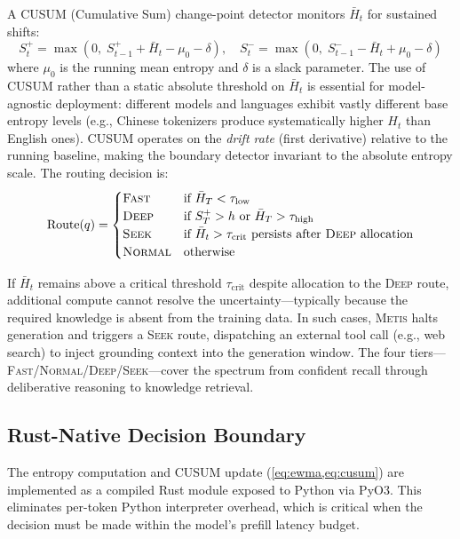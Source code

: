 \documentclass[11pt,a4paper]{article}
\newcommand{\metis}{\textsc{Metis}}
\begin{document}
A CUSUM (Cumulative Sum) change-point detector monitors $\bar{H}_t$ for sustained shifts:
\begin{equation}
    S_t^+ = \max(0,\; S_{t-1}^+ + \bar{H}_t - \mu_0 - \delta), \quad
    S_t^- = \max(0,\; S_{t-1}^- - \bar{H}_t + \mu_0 - \delta)
    \label{eq:cusum}
\end{equation}
where $\mu_0$ is the running mean entropy and $\delta$ is a slack parameter. The use of CUSUM rather than a static absolute threshold on $\bar{H}_t$ is essential for model-agnostic deployment: different models and languages exhibit vastly different base entropy levels (e.g., Chinese tokenizers produce systematically higher $H_t$ than English ones). CUSUM operates on the \emph{drift rate} (first derivative) relative to the running baseline, making the boundary detector invariant to the absolute entropy scale. The routing decision is:
\begin{equation}
    \text{Route}(q) = \begin{cases}
        \textsc{Fast} & \text{if } \bar{H}_T < \tau_{\text{low}} \\
        \textsc{Deep} & \text{if } S_T^+ > h \text{ or } \bar{H}_T > \tau_{\text{high}} \\
        \textsc{Seek} & \text{if } \bar{H}_t > \tau_{\text{crit}} \text{ persists after \textsc{Deep} allocation} \\
        \textsc{Normal} & \text{otherwise}
    \end{cases}
    \label{eq:route}
\end{equation}

If $\bar{H}_t$ remains above a critical threshold $\tau_{\text{crit}}$ despite allocation to the \textsc{Deep} route, additional compute cannot resolve the uncertainty---typically because the required knowledge is absent from the training data. In such cases, \metis{} halts generation and triggers a \textsc{Seek} route, dispatching an external tool call (e.g., web search) to inject grounding context into the generation window. The four tiers---\textsc{Fast}/\textsc{Normal}/\textsc{Deep}/\textsc{Seek}---cover the spectrum from confident recall through deliberative reasoning to knowledge retrieval.

\subsection{Rust-Native Decision Boundary}
\label{sec:rust}

The entropy computation and CUSUM update (\cref{eq:ewma,eq:cusum}) are implemented as a compiled Rust module exposed to Python via PyO3. This eliminates per-token Python interpreter overhead, which is critical when the decision must be made within the model's prefill latency budget.
\end{document}

